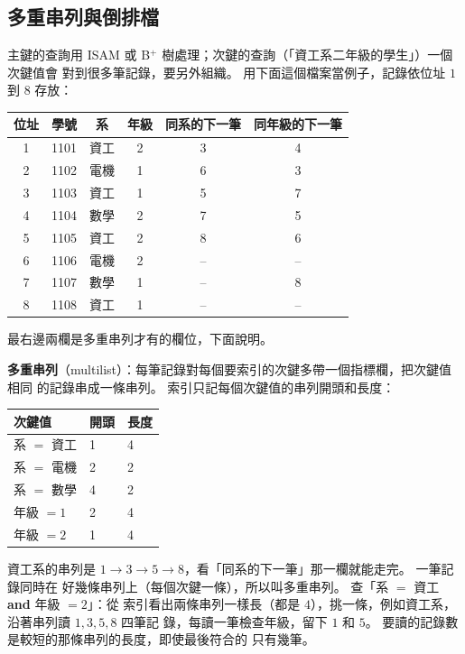 \subsection{多重串列與倒排檔}
\label{sec:mw-inverted}

主鍵的查詢用 ISAM 或 B$^{+}$ 樹處理；次鍵的查詢（「資工系二年級的學生」）一個次鍵值會
對到很多筆記錄，要另外組織。 用下面這個檔案當例子，記錄依位址 $1$ 到 $8$ 存放：
\begin{center}
\begin{tabular}{cccccc}
\toprule
位址 & 學號 & 系 & 年級 & 同系的下一筆 & 同年級的下一筆 \\
\midrule
1 & 1101 & 資工 & 2 & 3 & 4 \\
2 & 1102 & 電機 & 1 & 6 & 3 \\
3 & 1103 & 資工 & 1 & 5 & 7 \\
4 & 1104 & 數學 & 2 & 7 & 5 \\
5 & 1105 & 資工 & 2 & 8 & 6 \\
6 & 1106 & 電機 & 2 & -- & -- \\
7 & 1107 & 數學 & 1 & -- & 8 \\
8 & 1108 & 資工 & 1 & -- & -- \\
\bottomrule
\end{tabular}
\end{center}
最右邊兩欄是多重串列才有的欄位，下面說明。

\textbf{多重串列}（multilist）：每筆記錄對每個要索引的次鍵多帶一個指標欄，把次鍵值相同
的記錄串成一條串列。 索引只記每個次鍵值的串列開頭和長度：
\begin{center}
\begin{tabular}{lll}
\toprule
次鍵值 & 開頭 & 長度 \\
\midrule
系 $=$ 資工 & 1 & 4 \\
系 $=$ 電機 & 2 & 2 \\
系 $=$ 數學 & 4 & 2 \\
年級 $= 1$ & 2 & 4 \\
年級 $= 2$ & 1 & 4 \\
\bottomrule
\end{tabular}
\end{center}
資工系的串列是 $1 \to 3 \to 5 \to 8$，看「同系的下一筆」那一欄就能走完。 一筆記錄同時在
好幾條串列上（每個次鍵一條），所以叫多重串列。 查「系 $=$ 資工 \textbf{and} 年級 $= 2$」：從
索引看出兩條串列一樣長（都是 $4$），挑一條，例如資工系，沿著串列讀 $1, 3, 5, 8$ 四筆記
錄，每讀一筆檢查年級，留下 $1$ 和 $5$。 要讀的記錄數是較短的那條串列的長度，即使最後符合的
只有幾筆。

